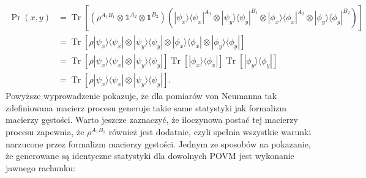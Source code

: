 \documentclass[10pt]{article} %
\DeclareMathOperator{\Trs}{Tr}
\newcommand{\Ket}[1]{|#1\rangle}
\newcommand{\Bra}[1]{\langle#1|}
\newcommand{\I}{\mathbb{1}}
\begin{document}
\begin{equation}
\begin{split}
\Pr(x,y) &= \Trs\left[ (\rho^{A_1B_1} \otimes \I^{A_2} \otimes \I^{B_2}) (\Ket{\psi_x}\Bra{\psi_x}^{A_1} \otimes \Ket{\psi_y}\Bra{\psi_y}^{B_1} \otimes \Ket{\phi_x}\Bra{\phi_x}^{A_2} \otimes \Ket{\phi_y}\Bra{\phi_y}^{B_2})\right] \\
&= \Trs\left[ \rho \Ket{\psi_x}\Bra{\psi_x}\otimes\Ket{\psi_y}\Bra{\psi_y} \otimes \Ket{\phi_x}\Bra{\phi_x}\otimes\Ket{\phi_y}\Bra{\phi_y}\right] \\
&= \Trs\left[ \rho \Ket{\psi_x}\Bra{\psi_x}\otimes\Ket{\psi_y}\Bra{\psi_y}\right] \Trs\left[\Ket{\phi_x}\Bra{\phi_x}\right] \Trs\left[\Ket{\phi_y}\Bra{\phi_y}\right]
\\
&= \Trs\left[ \rho \Ket{\psi_x}\Bra{\psi_x}\otimes\Ket{\psi_y}\Bra{\psi_y}\right].
\end{split}
\end{equation}
Powyższe wyprowadzenie pokazuje, że dla pomiarów von Neumanna tak zdefiniowana macierz procesu generuje takie same statystyki jak formalizm macierzy gęstości. Warto jeszcze zaznaczyć, że iloczynowa postać tej macierzy procesu zapewnia, że $\rho^{A_1B_1}$ również jest dodatnie, czyli spełnia wszystkie warunki narzucone przez formalizm macierzy gęstości. Jednym ze sposobów na pokazanie, że generowane są identyczne statystyki dla dowolnych POVM jest wykonanie jawnego rachunku:
\end{document}
